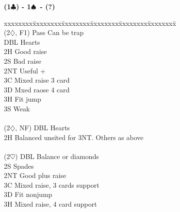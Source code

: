 \documentclass[10pt]{article}
\renewcommand{\c}{$\clubsuit$}
\renewcommand{\d}{$\diamondsuit$}
\newcommand{\h}{$\heartsuit$}
\newcommand{\s}{$\spadesuit$}
\newenvironment{bidtable}[1][]
{\textbf{#1}
  \begin{adjustwidth}{1em}{}
    \addvspace{2pt}
    \begin{tabbing}
      xxxxxxxx\=xxxxxxxx\=xxxxxxxx\=xxxxxxxx\=xxxxxxxx\=xxxxxxxx\=\kill}
{\end{tabbing}\end{adjustwidth}\bigskip}%
\begin{document}
\begin{multicols*}{2}
\begin{bidtable}[(1\c) - 1\s\ - (?)]
                                                                \\
(2\d, F1) \> Pass  \> Can be trap                               \\
          \> DBL   \> Hearts                                    \\
          \> 2H    \> Good raise                                \\
          \> 2S    \> Bad raise                                 \\
          \> 2NT   \> Useful +                                  \\
          \> 3C    \> Mixed raise 3 card                        \\
          \> 3D    \> Mxed raose 4 card                         \\
          \> 3H    \> Fit jump                                  \\
          \> 3S    \> Weak                                      \\
                                                                \\
(2\d, NF) \> DBL   \> Hearts                                    \\
          \> 2H    \> Balanced unsited for 3NT. Others as above \\
                                                                \\
(2\h)     \> DBL   \> Balance or diamonds                       \\
          \> 2S    \> Spades                                    \\
          \> 2NT   \> Good plus raise                           \\
          \> 3C    \> Mixed raise, 3 cards support              \\
          \> 3D    \> Fit nonjump                               \\
          \> 3H    \> Mixed raise, 4 card support
\end{bidtable}


\end{multicols*}
\end{document}
